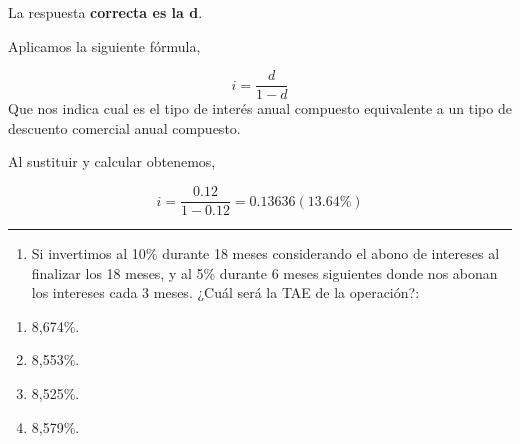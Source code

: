 \documentclass[
  letterpaper,
  DIV=11,
  numbers=noendperiod]{scrreprt}
\providecommand{\tightlist}{%
  \setlength{\itemsep}{0pt}\setlength{\parskip}{0pt}}\usepackage{longtable,booktabs,array}
\begin{document}
\begin{tcolorbox}[enhanced jigsaw, left=2mm, opacityback=0, colback=white, breakable, arc=.35mm, bottomrule=.15mm, rightrule=.15mm, toprule=.15mm, leftrule=.75mm, colframe=quarto-callout-tip-color-frame]
\begin{minipage}[t]{5.5mm}
\textcolor{quarto-callout-tip-color}{\faLightbulb}
\end{minipage}%
\begin{minipage}[t]{\textwidth - 5.5mm}

La respuesta \textbf{correcta es la d}.

Aplicamos la siguiente fórmula,

\[i=\frac{d}{1-d}\] Que nos indica cual es el tipo de interés anual
compuesto equivalente a un tipo de descuento comercial anual compuesto.

Al sustituir y calcular obtenemos,

\[i=\frac{0.12}{1-0.12}=0.13636(13.64\%)\]

\end{minipage}%
\end{tcolorbox}

\begin{center}\rule{0.5\linewidth}{0.5pt}\end{center}

\begin{enumerate}
\def\labelenumi{\arabic{enumi}.}
\setcounter{enumi}{18}
\tightlist
\item
  Si invertimos al 10\% durante 18 meses considerando el abono de
  intereses al finalizar los 18 meses, y al 5\% durante 6 meses
  siguientes donde nos abonan los intereses cada 3 meses. ¿Cuál será la
  TAE de la operación?:
\end{enumerate}

\begin{enumerate}
\def\labelenumi{\alph{enumi})}
\item
  8,674\%.
\item
  8,553\%.
\item
  8,525\%.
\item
  8,579\%.
\end{enumerate}
\end{document}
